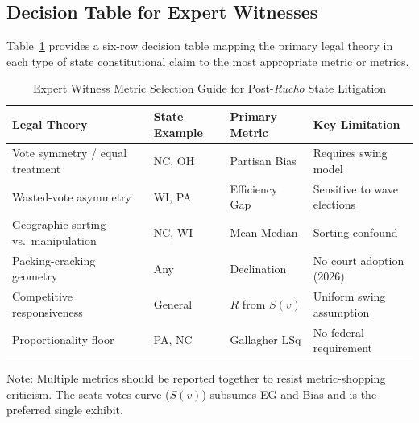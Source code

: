 \subsection{Decision Table for Expert Witnesses}

Table~\ref{tab:decision-table} provides a six-row decision table mapping the
primary legal theory in each type of state constitutional claim to the most
appropriate metric or metrics.

\begin{table}[ht]
\centering
\caption{Expert Witness Metric Selection Guide for Post-\textit{Rucho} State Litigation}
\label{tab:decision-table}
\begin{threeparttable}
\begin{tabular}{@{}lllp{4cm}@{}}
\toprule
Legal Theory & State Example & Primary Metric & Key Limitation \\
\midrule
Vote symmetry / equal treatment & NC, OH & Partisan Bias & Requires swing model \\
Wasted-vote asymmetry & WI, PA & Efficiency Gap & Sensitive to wave elections \\
Geographic sorting vs.\ manipulation & NC, WI & Mean-Median & Sorting confound \\
Packing-cracking geometry & Any & Declination & No court adoption (2026) \\
Competitive responsiveness & General & $R$ from $S(v)$ & Uniform swing assumption \\
Proportionality floor & PA, NC & Gallagher LSq & No federal requirement \\
\bottomrule
\end{tabular}
\begin{tablenotes}
\small
\item Note: Multiple metrics should be reported together to resist metric-shopping criticism.
The seats-votes curve ($S(v)$) subsumes EG and Bias and is the preferred single exhibit.
\end{tablenotes}
\end{threeparttable}
\end{table}
